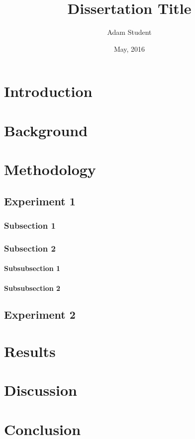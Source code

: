 \documentclass[beng,nooffset]{bangoree}
\title{Dissertation Title}
\author{Adam Student}
\date{May, 2016}
\begin{document}
\maketitle
\statements
\abstract{\lipsum[90-92]}
\acknowledgements{\lipsum[1]}
\tables

\content
\chapter{Introduction}
\lipsum[1-9]

\chapter{Background}
\lipsum[10-14]

\chapter{Methodology}
\section{Experiment 1}
\subsection{Subsection 1}
\lipsum[20-21]

\subsection{Subsection 2}
\subsubsection{Subsubsection 1}
\lipsum[21-22]

\subsubsection{Subsubsection 2}
\lipsum[22-24]

\section{Experiment 2}
\lipsum[24-26]

\chapter{Results}
\lipsum[50-53]

\chapter{Discussion}
\lipsum[55-58]

\chapter{Conclusion}
\lipsum[60]

\end{document}
